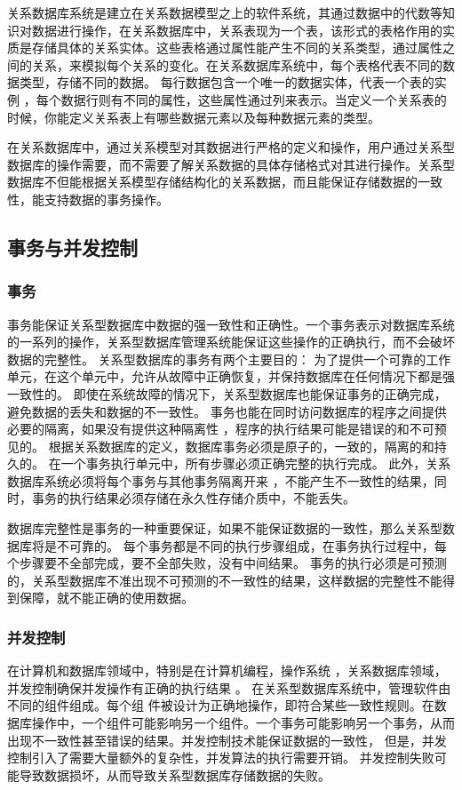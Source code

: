 关系数据库系统是建立在关系数据模型之上的软件系统，其通过数据中的代数等知识对数据进行操作，在关系数据库中，关系表现为一个表，该形式的表格作用的实质是存储具体的关系实体。这些表格通过属性能产生不同的关系类型，通过属性之间的关系，来模拟每个关系的变化。在关系数据库系统中，每个表格代表不同的数据类型，存储不同的数据。 每行数据包含一个唯一的数据实体，代表一个表的实例
，每个数据行则有不同的属性，这些属性通过列来表示。当定义一个关系表的时候，你能定义关系表上有哪些数据元素以及每种数据元素的类型。

在关系数据库中，通过关系模型对其数据进行严格的定义和操作，用户通过关系型数据库的操作需要，而不需要了解关系数据的具体存储格式对其进行操作。关系型数据库不但能根据关系模型存储结构化的关系数据，而且能保证存储数据的一致性，能支持数据的事务操作。
\subsection{事务与并发控制}
\subsubsection{事务}
事务能保证关系型数据库中数据的强一致性和正确性。一个事务表示对数据库系统的一系列的操作，关系型数据库管理系统能保证这些操作的正确执行，而不会破坏数据的完整性。
关系型数据库的事务有两个主要目的：
为了提供一个可靠的工作单元，在这个单元中，允许从故障中正确恢复，并保持数据库在任何情况下都是强一致性的。
即使在系统故障的情况下，关系型数据库也能保证事务的正确完成，避免数据的丢失和数据的不一致性。
事务也能在同时访问数据库的程序之间提供必要的隔离，如果没有提供这种隔离性
，程序的执行结果可能是错误的和不可预见的。
根据关系数据库的定义，数据库事务必须是原子的，一致的，隔离的和持久的。
在一个事务执行单元中，所有步骤必须正确完整的执行完成。
此外，关系数据库系统必须将每个事务与其他事务隔离开来
，不能产生不一致性的结果，同时，事务的执行结果必须存储在永久性存储介质中，不能丢失。

数据库完整性是事务的一种重要保证，如果不能保证数据的一致性，那么关系型数据库将是不可靠的。
每个事务都是不同的执行步骤组成，在事务执行过程中，每个步骤要不全部完成，要不全部失败，没有中间结果。
事务的执行必须是可预测的，关系型数据库不准出现不可预测的不一致性的结果，这样数据的完整性不能得到保障，就不能正确的使用数据。
\subsubsection{并发控制}
在计算机和数据库领域中，特别是在计算机编程，操作系统
，关系数据库领域，并发控制确保并发操作有正确的执行结果
。
在关系型数据库系统中，管理软件由不同的组件组成。每个组
件被设计为正确地操作，即符合某些一致性规则。在数据库操作中，一个组件可能影响另一个组件。一个事务可能影响另一个事务，从而出现不一致性甚至错误的结果。并发控制技术能保证数据的一致性，
但是，并发控制引入了需要大量额外的复杂性，并发算法的执行需要开销。
并发控制失败可能导致数据损坏，从而导致关系型数据库存储数据的失败。

